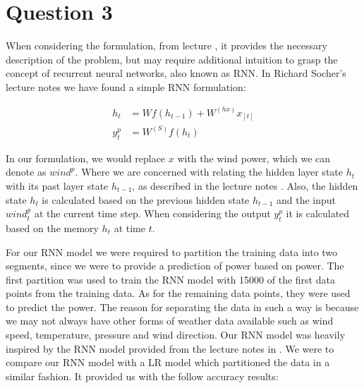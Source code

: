 \documentclass[
11pt, %
english, %
singlespacing, %
parskip, %
headsepline, %
]{report} %
\begin{document}
\section{Question 3}
    
    When considering the formulation, from lecture \cite{rnnLec}, it provides the necessary description of the problem, but may require additional intuition to grasp the concept of recurrent neural networks, also known as RNN. In Richard Socher's lecture notes \cite{rnnForm} we have found a simple RNN formulation:
    
    
    \begin{equation}
        \begin{split}
        h_{t} & = Wf(h_{t-1}) + W^{(hx)}x_{[t]} \\
        y_{t}^{p}  & = W^{(S)}f(h_{t})
        \end{split}
    \end{equation}
    
    In our formulation, we would replace $x$ with the wind power, which we can denote as $wind^{p}$. Where we are concerned with relating the hidden layer state $h_{t}$ with its past layer state $h_{t-1}$, as described in the lecture notes \cite{rnnLec}. Also, the hidden state $h_{t}$ is calculated based on the previous hidden state $h_{t-1}$ and the input $wind^{p}_{t}$ at the current time step. When considering the output $y_{t}^{p}$ it is calculated based on the memory $h_{t}$ at time $t$.
    
    For our RNN model we were required to partition the training data into two segments, since we were to provide a prediction of power based on power. The first partition was used to train the RNN model with 15000 of the first data points from the training data. As for the remaining data points, they were used to predict the power. The reason for separating the data in such a way is because we may not always have other forms of weather data available such as wind speed, temperature, pressure and wind direction. Our RNN model was heavily inspired by the RNN model provided from the lecture notes in \cite{rnnCode}. We were to compare our RNN model with a LR model which partitioned the data in a similar fashion. It provided us with the follow accuracy results:
   
\end{document}
